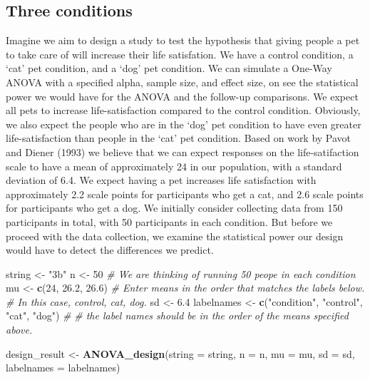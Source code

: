 \documentclass[]{article}
\newenvironment{Shaded}{\begin{snugshade}}{\end{snugshade}}
\newcommand{\KeywordTok}[1]{\textcolor[rgb]{0.13,0.29,0.53}{\textbf{#1}}}
\newcommand{\DataTypeTok}[1]{\textcolor[rgb]{0.13,0.29,0.53}{#1}}
\newcommand{\DecValTok}[1]{\textcolor[rgb]{0.00,0.00,0.81}{#1}}
\newcommand{\FloatTok}[1]{\textcolor[rgb]{0.00,0.00,0.81}{#1}}
\newcommand{\StringTok}[1]{\textcolor[rgb]{0.31,0.60,0.02}{#1}}
\newcommand{\CommentTok}[1]{\textcolor[rgb]{0.56,0.35,0.01}{\textit{#1}}}
\newcommand{\NormalTok}[1]{#1}
\begin{document}
\subsection{Three conditions}\label{three-conditions}

Imagine we aim to design a study to test the hypothesis that giving
people a pet to take care of will increase their life satisfation. We
have a control condition, a `cat' pet condition, and a `dog' pet
condition. We can simulate a One-Way ANOVA with a specified alpha,
sample size, and effect size, on see the statistical power we would have
for the ANOVA and the follow-up comparisons. We expect all pets to
increase life-satisfaction compared to the control condition. Obviously,
we also expect the people who are in the `dog' pet condition to have
even greater life-satisfaction than people in the `cat' pet condition.
Based on work by Pavot and Diener (1993) we believe that we can expect
responses on the life-satifaction scale to have a mean of approximately
24 in our population, with a standard deviation of 6.4. We expect having
a pet increases life satisfaction with approximately 2.2 scale points
for participants who get a cat, and 2.6 scale points for participants
who get a dog. We initially consider collecting data from 150
participants in total, with 50 participants in each condition. But
before we proceed with the data collection, we examine the statistical
power our design would have to detect the differences we predict.

\begin{Shaded}
\begin{Highlighting}[]
\NormalTok{string <-}\StringTok{ "3b"}
\NormalTok{n <-}\StringTok{ }\DecValTok{50}
\CommentTok{# We are thinking of running 50 peope in each condition}
\NormalTok{mu <-}\StringTok{ }\KeywordTok{c}\NormalTok{(}\DecValTok{24}\NormalTok{, }\FloatTok{26.2}\NormalTok{, }\FloatTok{26.6}\NormalTok{)}
\CommentTok{# Enter means in the order that matches the labels below.}
\CommentTok{# In this case, control, cat, dog. }
\NormalTok{sd <-}\StringTok{ }\FloatTok{6.4}
\NormalTok{labelnames <-}\StringTok{ }\KeywordTok{c}\NormalTok{(}\StringTok{"condition"}\NormalTok{, }\StringTok{"control"}\NormalTok{, }\StringTok{"cat"}\NormalTok{, }\StringTok{"dog"}\NormalTok{) }\CommentTok{#}
\CommentTok{# the label names should be in the order of the means specified above.}

\NormalTok{design_result <-}\StringTok{ }\KeywordTok{ANOVA_design}\NormalTok{(}\DataTypeTok{string =}\NormalTok{ string,}
                   \DataTypeTok{n =}\NormalTok{ n, }
                   \DataTypeTok{mu =}\NormalTok{ mu, }
                   \DataTypeTok{sd =}\NormalTok{ sd, }
                   \DataTypeTok{labelnames =}\NormalTok{ labelnames)}
\end{Highlighting}
\end{Shaded}
\end{document}
